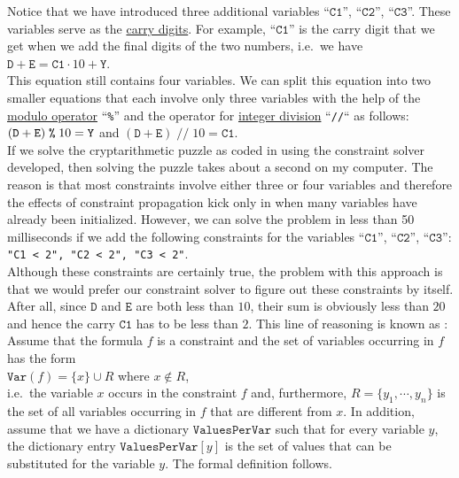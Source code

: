 Notice that we have introduced three additional variables ``$\texttt{C1}$'', ``$\texttt{C2}$'', ``$\texttt{C3}$''. 
These variables serve as the \href{https://en.wikipedia.org/wiki/Carry_(arithmetic)}{carry digits}.  For
example, ``$\texttt{C1}$'' is the carry digit that we get when we add the final digits of the two
numbers, i.e.~we have
\\[0.2cm]
\hspace*{1.3cm}
$\texttt{D} + \texttt{E} = \texttt{C1} \cdot 10 + \texttt{Y}$.
\\[0.2cm]
This equation still contains four variables.  We can split this equation into two smaller equations that each
involve only three variables with the help of the \href{https://en.wikipedia.org/wiki/Modulo}{modulo operator}
``\texttt{\%}'' 
and the operator for \href{https://en.wikipedia.org/wiki/Division_(mathematics)#Of_integers}{integer division}
``\texttt{//}`` as follows:  
\\[0.2cm]
\hspace*{1.3cm}
$(\texttt{D} + \texttt{E})\; \texttt{\symbol{37}}\; 10 = \texttt{Y}$ \quad and \quad
$(\texttt{D} + \texttt{E}) \;\texttt{//}\; 10 = \texttt{C1}$.
\\[0.2cm]
If we solve the cryptarithmetic puzzle as coded in  using the
constraint solver developed, then solving the puzzle takes about
a second on my computer.  The reason is that most constraints involve either three or four variables and
therefore the effects of constraint propagation kick only in when many variables have already been initialized.
However, we can solve the problem in less than 50 milliseconds if we add the following constraints for the 
variables ``$\texttt{C1}$'', ``$\texttt{C2}$'', ``$\texttt{C3}$'':
\\[0.2cm]
\hspace*{1.3cm}
\texttt{"C1 < 2", "C2 < 2", "C3 < 2"}.
\\[0.2cm]
Although these constraints are certainly true, the problem with this approach is that we would prefer our
constraint solver to figure out these constraints by itself.  After all, since $\texttt{D}$ and
$\texttt{E}$ are both less than $10$, their sum is obviously less than $20$ and hence the carry $\texttt{C1}$
has to be less than $2$.  This line of reasoning is known as :
Assume that the formula $f$ is a constraint and the set of variables occurring in $f$ has the form
\\[0.2cm]
\hspace*{1.3cm}
$\texttt{Var}(f) = \{ x \} \cup R$ \quad where $x \not\in R$,
\\[0.2cm]
i.e.~the variable $x$ occurs in the constraint $f$ and, furthermore, $R = \{y_1, \cdots, y_n\}$ is the set of
all variables occurring 
in $f$ that are different from $x$.  In addition, assume that we have a dictionary $\texttt{ValuesPerVar}$ such that
for every variable $y$, the dictionary entry $\texttt{ValuesPerVar}[y]$ is the set of values that can be substituted
for the variable $y$.  The formal definition follows.

